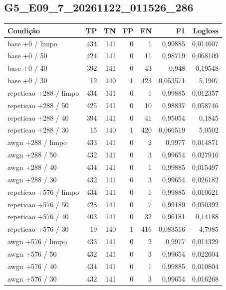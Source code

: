 \subsection{G5\_E09\_7\_20261122\_011526\_286}
\small\begin{longtable}{@{}p{.38\linewidth}rrrrrr@{}}
\toprule Condição & TP & TN & FP & FN & F1 & Logloss\\\midrule\endhead
base +0 /\allowbreak{} limpo & 434 & 141 & 0 & 1 & 0,99885 & 0,014607\\
base +0 /\allowbreak{} 50 & 424 & 141 & 0 & 11 & 0,98719 & 0,068109\\
base +0 /\allowbreak{} 40 & 392 & 141 & 0 & 43 & 0,948 & 0,19548\\
base +0 /\allowbreak{} 30 & 12 & 140 & 1 & 423 & 0,053571 & 5,1907\\
repeticao +288 /\allowbreak{} limpo & 434 & 141 & 0 & 1 & 0,99885 & 0,012357\\
repeticao +288 /\allowbreak{} 50 & 425 & 141 & 0 & 10 & 0,98837 & 0,058746\\
repeticao +288 /\allowbreak{} 40 & 394 & 141 & 0 & 41 & 0,95054 & 0,1845\\
repeticao +288 /\allowbreak{} 30 & 15 & 140 & 1 & 420 & 0,066519 & 5,0502\\
awgn +288 /\allowbreak{} limpo & 433 & 141 & 0 & 2 & 0,9977 & 0,014871\\
awgn +288 /\allowbreak{} 50 & 432 & 141 & 0 & 3 & 0,99654 & 0,027916\\
awgn +288 /\allowbreak{} 40 & 434 & 141 & 0 & 1 & 0,99885 & 0,015497\\
awgn +288 /\allowbreak{} 30 & 432 & 141 & 0 & 3 & 0,99654 & 0,026182\\
repeticao +576 /\allowbreak{} limpo & 434 & 141 & 0 & 1 & 0,99885 & 0,010621\\
repeticao +576 /\allowbreak{} 50 & 428 & 141 & 0 & 7 & 0,99189 & 0,050392\\
repeticao +576 /\allowbreak{} 40 & 403 & 141 & 0 & 32 & 0,96181 & 0,14188\\
repeticao +576 /\allowbreak{} 30 & 19 & 140 & 1 & 416 & 0,083516 & 4,7985\\
awgn +576 /\allowbreak{} limpo & 433 & 141 & 0 & 2 & 0,9977 & 0,014329\\
awgn +576 /\allowbreak{} 50 & 432 & 141 & 0 & 3 & 0,99654 & 0,022604\\
awgn +576 /\allowbreak{} 40 & 434 & 141 & 0 & 1 & 0,99885 & 0,010804\\
awgn +576 /\allowbreak{} 30 & 432 & 141 & 0 & 3 & 0,99654 & 0,016268\\

\end{longtable}
